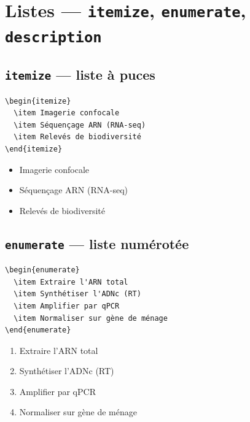\documentclass[12pt, a4paper]{article}
\begin{document}
\section{Listes — \texttt{itemize}, \texttt{enumerate}, \texttt{description}}

\subsection{\texttt{itemize} — liste à puces}

\begin{demo}
\begin{lstlisting}[style=latexcode]
\begin{itemize}
  \item Imagerie confocale
  \item Séquençage ARN (RNA-seq)
  \item Relevés de biodiversité
\end{itemize}
\end{lstlisting}
\tcblower
\begin{itemize}[noitemsep, topsep=2pt]
  \item Imagerie confocale
  \item Séquençage ARN (RNA-seq)
  \item Relevés de biodiversité
\end{itemize}
\end{demo}

\subsection{\texttt{enumerate} — liste numérotée}

\begin{demo}
\begin{lstlisting}[style=latexcode]
\begin{enumerate}
  \item Extraire l'ARN total
  \item Synthétiser l'ADNc (RT)
  \item Amplifier par qPCR
  \item Normaliser sur gène de ménage
\end{enumerate}
\end{lstlisting}
\tcblower
\begin{enumerate}[noitemsep, topsep=2pt]
  \item Extraire l'ARN total
  \item Synthétiser l'ADNc (RT)
  \item Amplifier par qPCR
  \item Normaliser sur gène de ménage
\end{enumerate}
\end{demo}
\end{document}
